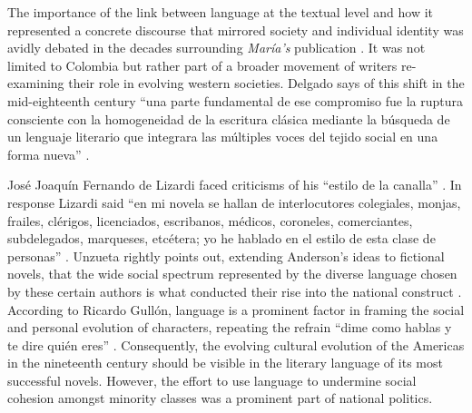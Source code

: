 \documentclass[12pt]{report}
\begin{document}
The importance of the link between language at the textual level and how it represented a concrete discourse that mirrored society and individual identity was avidly debated in the decades surrounding \textit{María's} publication \autocite[4]{Delgado2000}.
It was not limited to Colombia but rather part of a broader movement of writers re-examining their role in evolving western societies.
Delgado says of this shift in the mid-eighteenth century \enquote{una parte fundamental de ese compromiso fue la ruptura consciente con la homogeneidad de la escritura clásica mediante la búsqueda de un lenguaje literario que integrara las múltiples voces del tejido social en una forma nueva} \autocite[11]{Delgado2000}.

José Joaquín Fernando de Lizardi faced criticisms of his \enquote{estilo de la canalla} \autocite[144]{Unzueta2003}.
In response Lizardi said \enquote{en mi novela se hallan de interlocutores colegiales, monjas, frailes, clérigos, licenciados, escribanos, médicos, coroneles, comerciantes, subdelegados, marqueses, etcétera; yo he hablado en el estilo de esta clase de personas} \autocite[144]{Unzueta2003}.
Unzueta rightly points out, extending Anderson's ideas to fictional novels, that the wide social spectrum represented by the diverse language chosen by these certain authors is what conducted their rise into the national construct \autocite[144]{Unzueta2003}.
According to Ricardo Gullón, language is a prominent factor in framing the social and personal evolution of characters, repeating the refrain \enquote{dime como hablas y te dire quién eres} \autocite[11]{Delgado2000}.
Consequently, the evolving cultural evolution of the Americas in the nineteenth century should be visible in the literary language of its most successful novels.
However, the effort to use language to undermine social cohesion amongst minority classes was a prominent part of national politics.
\end{document}
